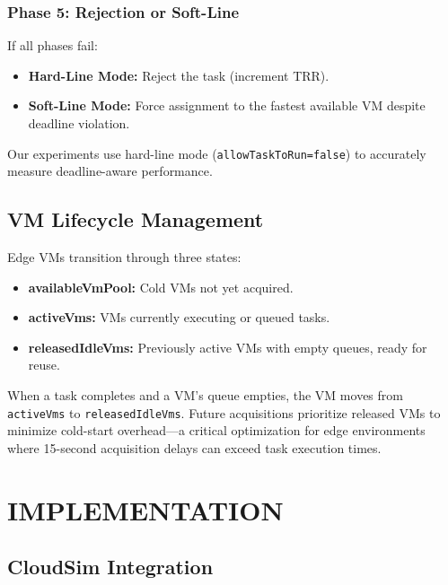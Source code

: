 \documentclass[12pt]{report}
\begin{document}
\subsection{Phase 5: Rejection or Soft-Line}

If all phases fail:
\begin{itemize}
    \item \textbf{Hard-Line Mode:} Reject the task (increment TRR).
    \item \textbf{Soft-Line Mode:} Force assignment to the fastest available VM despite deadline violation.
\end{itemize}

Our experiments use hard-line mode (\texttt{allowTaskToRun=false}) to accurately measure deadline-aware performance.

\section{VM Lifecycle Management}

Edge VMs transition through three states:

\begin{itemize}
    \item \textbf{availableVmPool:} Cold VMs not yet acquired.
    \item \textbf{activeVms:} VMs currently executing or queued tasks.
    \item \textbf{releasedIdleVms:} Previously active VMs with empty queues, ready for reuse.
\end{itemize}

When a task completes and a VM's queue empties, the VM moves from \texttt{activeVms} to \texttt{releasedIdleVms}. Future acquisitions prioritize released VMs to minimize cold-start overhead—a critical optimization for edge environments where 15-second acquisition delays can exceed task execution times.


\chapter{IMPLEMENTATION}
\label{ch:implementation}

\section{CloudSim Integration}
\end{document}
